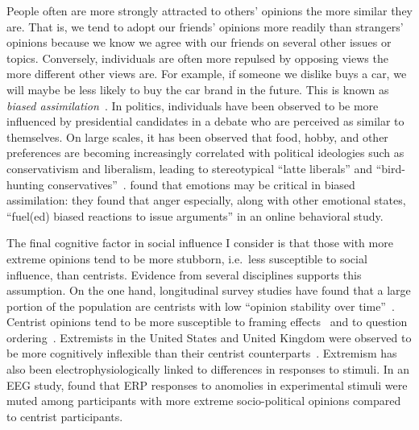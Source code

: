\documentclass[12pt,letterpaper]{article}
\begin{document}
People often are more strongly attracted to others' opinions the more similar
they are. That is, we tend to adopt our friends' opinions more readily than
strangers' opinions because we know we agree with our friends on several other
issues or topics. Conversely, individuals are often
more repulsed by opposing views the more different other views are. For 
example, if someone we dislike buys a car, we will maybe be less likely to buy the
car brand in the future. This is
known as \emph{biased assimilation}~\cite{Lord1979}.
In politics, individuals have been observed to be more influenced by presidential
candidates in a debate who are perceived as similar to themselves.
On large scales, it has been observed that food, hobby, and other
preferences are becoming increasingly correlated with political ideologies such
as conservativism and liberalism, leading to stereotypical ``latte liberals'' and
``bird-hunting conservatives''~\cite{DellaPosta2015}.
 found that emotions may be critical in biased assimilation: they found that
anger especially, along with other emotional states, ``fuel(ed) biased reactions
to issue arguments'' in an online behavioral study. 

The final cognitive factor in social influence I consider is that those with
more extreme opinions tend to be more stubborn, i.e.\ less susceptible to
social influence, than centrists. Evidence from several disciplines supports
this assumption. On the one hand, longitudinal survey studies
have found that a large portion of the population are centrists with
low ``opinion stability over time''~\cite{Converse1964,Zaller1992,Kinder2017}. 
Centrist opinions tend to be more susceptible to framing effects~\cite{Chong2007}
and to question ordering~\cite{Zaller1992}. 
Extremists in the United States and United Kingdom were observed to be 
more cognitively inflexible than their centrist counterparts~\cite{Zmigrod2019a}.
Extremism has also been electrophysiologically linked
to differences in responses to stimuli. In an EEG study,  found that ERP
responses to anomolies in experimental stimuli were muted among participants
with more extreme socio-political opinions compared to centrist participants.
\end{document}
